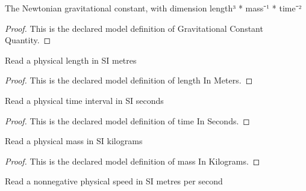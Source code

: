 \begin{definition}
  \label{def:physics:phyx-mini-0611:phyxminiproblems-problemphyxmini0611-gravitationalconstantquantity}
  The Newtonian gravitational constant, with dimension length³ * mass⁻¹ * time⁻²
\end{definition}
\begin{proof}
  This is the declared model definition of Gravitational Constant Quantity.
\end{proof}
\begin{definition}
  \label{def:physics:phyx-mini-0611:phyxminiproblems-problemphyxmini0611-lengthinmeters}
  Read a physical length in SI metres
\end{definition}
\begin{proof}
  This is the declared model definition of length In Meters.
\end{proof}
\begin{definition}
  \label{def:physics:phyx-mini-0611:phyxminiproblems-problemphyxmini0611-timeinseconds}
  Read a physical time interval in SI seconds
\end{definition}
\begin{proof}
  This is the declared model definition of time In Seconds.
\end{proof}
\begin{definition}
  \label{def:physics:phyx-mini-0611:phyxminiproblems-problemphyxmini0611-massinkilograms}
  Read a physical mass in SI kilograms
\end{definition}
\begin{proof}
  This is the declared model definition of mass In Kilograms.
\end{proof}
\begin{definition}
  \label{def:physics:phyx-mini-0611:phyxminiproblems-problemphyxmini0611-speedinmeterspersecond}
  Read a nonnegative physical speed in SI metres per second
\end{definition}

